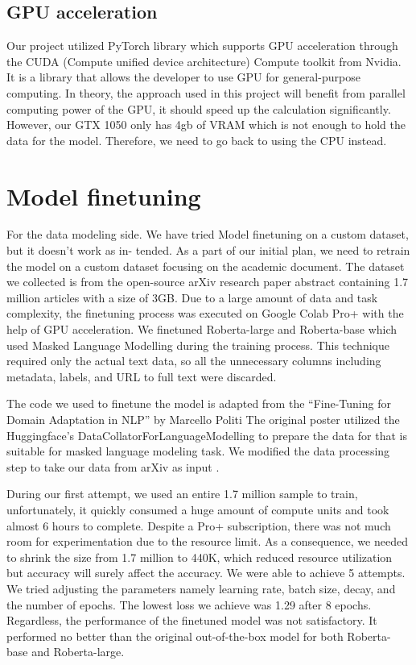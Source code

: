 \documentclass[12pt,oneside,openright,a4paper]{cpe-english-project}
\begin{document}
\subsection{GPU acceleration}

Our project utilized PyTorch library which supports GPU acceleration through the CUDA (Compute unified device architecture) Compute toolkit from Nvidia. It is a library that allows the developer to use GPU for general-purpose computing. In theory, the approach used in this project will benefit from parallel computing power of the GPU, it should speed up the calculation significantly. However, our GTX 1050 only has 4gb of VRAM which is not enough to hold the data for the model. Therefore, we need to go back to using the CPU instead.
\section{Model finetuning}

For the data modeling side. We have tried Model finetuning on a custom dataset, but it doesn’t work as in- tended. As a part of our initial plan, we need to retrain the model on a custom dataset focusing on the academic document. The dataset we collected is from the open-source arXiv research paper abstract containing 1.7 million articles with a size of 3GB. Due to a large amount of data and task complexity, the finetuning process was executed on Google Colab Pro+ with the help of GPU acceleration. We finetuned Roberta-large and Roberta-base which used Masked Language Modelling during the training process. This technique required only the actual text data, so all the unnecessary columns including metadata, labels, and URL to full text were discarded. 

The code we used to finetune the model is adapted from the “Fine-Tuning for Domain Adaptation in NLP” by Marcello Politi \cite{s}
The original poster utilized the Huggingface’s DataCollatorForLanguageModelling to prepare the data for that is suitable for masked language modeling task. We modified the data processing step to take our data from arXiv as input \cite{t}. 
 
During our first attempt, we used an entire 1.7 million sample to train, unfortunately, it quickly consumed a huge amount of compute units and took almost 6 hours to complete. Despite a Pro+ subscription, there was not much room for experimentation due to the resource limit. As a consequence, we needed to shrink the size from 1.7 million to 440K, which reduced resource utilization but accuracy will surely affect the accuracy. We were able to achieve 5 attempts. We tried adjusting the parameters namely learning rate, batch size, decay, and the number of epochs. The lowest loss we achieve was 1.29 after 8 epochs. Regardless, the performance of the finetuned model was not satisfactory. It performed no better than the original out-of-the-box model for both Roberta-base and Roberta-large.
\end{document}
